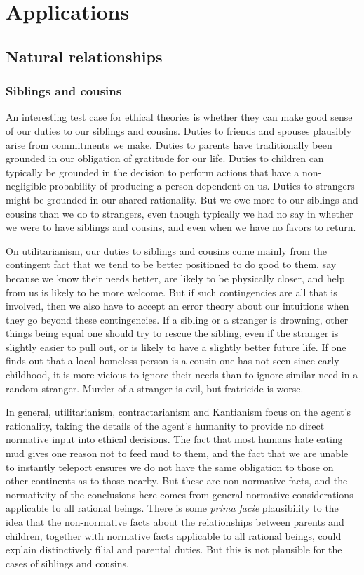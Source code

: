 \def\mychapter{IV}
\chapter{Applications}\label{ch:applied-ethics}
\section{Natural relationships}
\subsection{Siblings and cousins}
An interesting test case for ethical theories is whether they can make good sense of our duties to our siblings and cousins. Duties to friends and spouses plausibly
arise from commitments we make. Duties to parents have traditionally been grounded in our obligation of gratitude for our life. Duties to children can
typically be grounded in the decision to perform actions that have a non-negligible probability of producing a person dependent on us. Duties to strangers
might be grounded in our shared rationality. But we owe more to our siblings and cousins than we do to strangers, even though typically we had no say in whether
we were to have siblings and cousins, and even when we have no favors to return. 

On utilitarianism, our duties to siblings and cousins come mainly from the contingent fact that we tend to be better positioned to do good to them, say because we know
their needs better, are likely to be physically closer, and help from us is likely to be more welcome. But if such contingencies are all that is involved, then we also
have to accept an error theory about our intuitions when they go beyond these contingencies. If a sibling or a stranger is drowning, other things being equal one should
try to rescue the sibling, even if the stranger is slightly easier to pull out, or is likely to have a slightly better future life. If one finds out that a local
homeless person is a cousin one has not seen since early childhood, it is more vicious to ignore their needs than to ignore similar need in a random stranger.
Murder of a stranger is evil, but fratricide is worse. 

In general, utilitarianism, contractarianism and Kantianism focus on the agent's rationality, taking the details of the agent's humanity to provide no direct normative 
input into ethical decisions. The fact that most humans hate eating mud gives one reason not to feed mud to them, and the fact that we are unable to instantly
teleport ensures we do not have the same obligation to those on other continents as to those nearby. But these are non-normative facts, and the normativity of the
conclusions here comes from general normative considerations applicable to all rational beings. There is some \textit{prima facie} plausibility to the idea
that the non-normative facts about the relationships between parents and children, together with normative facts applicable to all rational beings, could explain
distinctively filial and parental duties. But this is not plausible for the cases of siblings and cousins.

